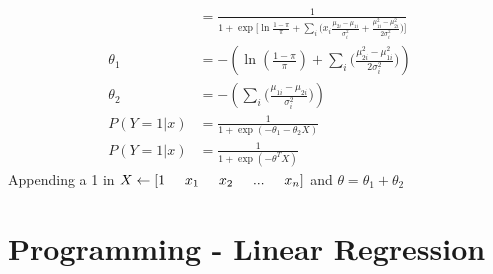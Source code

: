 \documentclass[12pt]{article}
\begin{document}
\begin{enumerate}[label=\alph*.]
\begin{align}
&= \frac{1}{1+ \exp \bigg[\ln\frac{1-\pi}{\pi}+ \sum_i\bigg(x_i \frac{\mu_{2i} - \mu_{1i}}{\sigma_i^2} + \frac{\mu_{1i}^2 - \mu_{2i}^2}{2\sigma_i^2}\bigg) \bigg]}\\
\theta_1 &= - (\ln (\frac{1-\pi}{\pi}) + \sum_i\big(\frac{\mu_{2i}^2 - \mu_{1i}^2}{2\sigma_i^2}\big))\\
\theta_2 &= - (\sum_i\big(\frac{\mu_{1i} - \mu_{2i}}{\sigma_i^2}\big))\\
P(Y=1|x) &= \frac{1}{1+\exp(-\theta_1 - \theta_2 X)} \\
P(Y=1|x) &= \frac{1}{1+\exp(-\theta^T X)}
\end{align}
Appending a 1 in  $X \leftarrow [1 \hspace{5mm}x_1\hspace{5mm}x_2\hspace{5mm}...\hspace{5mm}x_n ]$ and $\theta = \theta_1 + \theta_2$
\end{enumerate}
\newpage
\section{Programming - Linear Regression}
\end{document}

